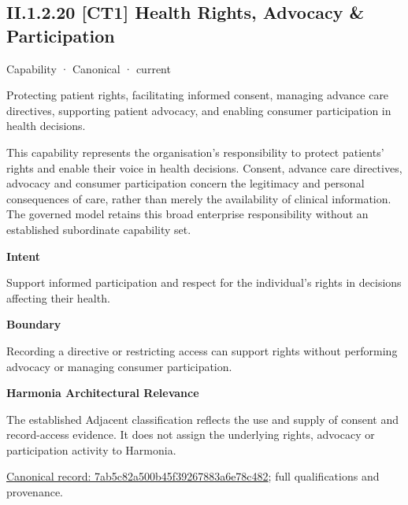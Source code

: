 \subsection*{II.1.2.20 [CT1] Health Rights, Advocacy \& Participation}
\label{navigation:II.1.2.20}

\label{element:7ab5c82a500b45f39267883a6e78c482}
{\small Capability · Canonical · current}\par

Protecting patient rights, facilitating informed consent, managing advance care directives, supporting patient advocacy, and enabling consumer participation in health decisions.



This capability represents the organisation's responsibility to protect patients' rights and enable their voice in health decisions. Consent, advance care directives, advocacy and consumer participation concern the legitimacy and personal consequences of care, rather than merely the availability of clinical information. The governed model retains this broad enterprise responsibility without an established subordinate capability set.



\textbf{Intent}



Support informed participation and respect for the individual's rights in decisions affecting their health.



\textbf{Boundary}



Recording a directive or restricting access can support rights without performing advocacy or managing consumer participation.



\textbf{Harmonia Architectural Relevance}



The established Adjacent classification reflects the use and supply of consent and record-access evidence. It does not assign the underlying rights, advocacy or participation activity to Harmonia.


{\footnotesize \href{../../../../continuum/strategy/capability/7ab5c82a500b45f39267883a6e78c482.md}{Canonical record: 7ab5c82a500b45f39267883a6e78c482}; full qualifications and provenance.}\par
